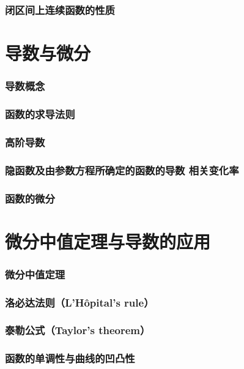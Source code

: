 \documentclass{article}
\begin{document}
  \section{闭区间上连续函数的性质}
    

  \newpage
  \part{导数与微分}
  \section{导数概念}
    
  \section{函数的求导法则}
    
  \section{高阶导数}
    
  \section{隐函数及由参数方程所确定的函数的导数 相关变化率}
    
  \section{函数的微分}
    

  \newpage
  \part{微分中值定理与导数的应用}
  \section{微分中值定理}
    
  \section{洛必达法则（L'Hôpital's rule）}
    
  \section{泰勒公式（Taylor's theorem）}
    
  \section{函数的单调性与曲线的凹凸性}
    
\end{document}
